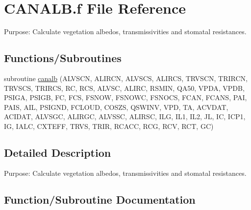 \hypertarget{CANALB_8f}{}\section{C\+A\+N\+A\+L\+B.\+f File Reference}
\label{CANALB_8f}


Purpose\+: Calculate vegetation albedos, transmissivities and stomatal resistances.  


\subsection*{Functions/\+Subroutines}
\begin{DoxyCompactItemize}
\item 
subroutine \hyperlink{CANALB_8f_ad01e3318e7b9408fb2f037378ffb6589}{canalb} (A\+L\+V\+S\+C\+N, A\+L\+I\+R\+C\+N, A\+L\+V\+S\+C\+S, A\+L\+I\+R\+C\+S, T\+R\+V\+S\+C\+N, T\+R\+I\+R\+C\+N, T\+R\+V\+S\+C\+S, T\+R\+I\+R\+C\+S, R\+C, R\+C\+S, A\+L\+V\+S\+C, A\+L\+I\+R\+C, R\+S\+M\+I\+N, Q\+A50, V\+P\+D\+A, V\+P\+D\+B, P\+S\+I\+G\+A, P\+S\+I\+G\+B, F\+C, F\+C\+S, F\+S\+N\+O\+W, F\+S\+N\+O\+W\+C, F\+S\+N\+O\+C\+S, F\+C\+A\+N, F\+C\+A\+N\+S, P\+A\+I, P\+A\+I\+S, A\+I\+L, P\+S\+I\+G\+N\+D, F\+C\+L\+O\+U\+D, C\+O\+S\+Z\+S, Q\+S\+W\+I\+N\+V, V\+P\+D, T\+A, A\+C\+V\+D\+A\+T, A\+C\+I\+D\+A\+T, A\+L\+V\+S\+G\+C, A\+L\+I\+R\+G\+C, A\+L\+V\+S\+S\+C, A\+L\+I\+R\+S\+C, I\+L\+G, I\+L1, I\+L2, J\+L, I\+C, I\+C\+P1, I\+G, I\+A\+L\+C, C\+X\+T\+E\+F\+F, T\+R\+V\+S, T\+R\+I\+R, R\+C\+A\+C\+C, R\+C\+G, R\+C\+V, R\+C\+T, G\+C)
\end{DoxyCompactItemize}


\subsection{Detailed Description}
Purpose\+: Calculate vegetation albedos, transmissivities and stomatal resistances. 



\subsection{Function/\+Subroutine Documentation}
\hypertarget{CANALB_8f_ad01e3318e7b9408fb2f037378ffb6589}{}
